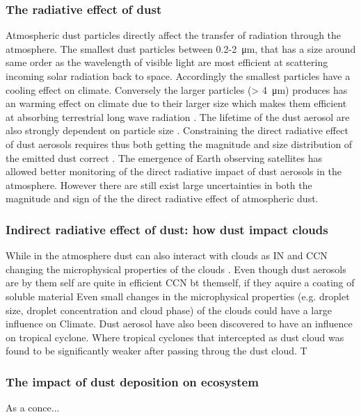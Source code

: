 \subsubsection{The radiative effect of dust}
Atmospheric dust particles directly affect the transfer of radiation through the atmosphere. The smallest dust particles between 0.2-\SI{2}{\micro\metre}, that has a size around same order as the wavelength of visible light are  most efficient at scattering incoming solar radiation back to space. Accordingly the smallest particles have a cooling effect on climate. Conversely the larger particles (> \SI{4}{\micro\metre}) produces has an warming effect on climate due to their larger size which makes them efficient at absorbing terrestrial long wave radiation \parencite{choobari2014global}.
The lifetime of the dust aerosol are also strongly dependent on particle size \parencite{mahowald2014size}. Constraining the direct radiative effect of dust aerosols requires thus both getting the magnitude and size distribution of the emitted dust correct \parencite{adebiyi2020dust}. The emergence of Earth observing satellites has allowed better monitoring of the direct radiative impact of dust aerosols in the atmosphere. However there are still exist large uncertainties in both the magnitude and sign of the the direct radiative effect of atmospheric dust. 

\subsubsection{Indirect radiative effect of dust: how dust impact clouds}
While in the atmosphere dust can also interact with clouds as IN and CCN changing the microphysical properties of the clouds \parencite{lohmann2006sensitivity}. Even though dust aerosols are by them self are quite in efficient CCN bt themself, if they aquire a coating of soluble material  Even small changes in the microphysical properties (e.g. droplet size, droplet concentration and cloud phase) of the clouds could have a large influence on Climate. Dust aerosol have also been discovered to have an influence on tropical cyclone. Where tropical cyclones that intercepted as dust cloud was found to be significantly weaker after passing throug the dust cloud. T 

\subsubsection{The impact of dust deposition on ecosystem}
As a conce... 
       
